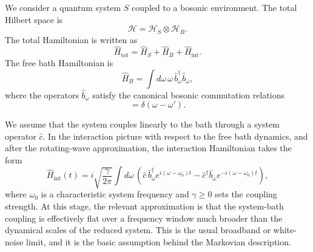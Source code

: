 We consider a quantum system $S$ coupled to a bosonic environment. The total Hilbert space is
\begin{equation}
	\mathcal{H}=\mathcal{H}_S \otimes \mathcal{H}_B.
\end{equation}
The total Hamiltonian is written as
\begin{equation}
	\hat H_{\mathrm{tot}}
	=
	\hat H_S+\hat H_B+\hat H_{\mathrm{int}}.
	\label{eq:oqs_total_hamiltonian}
\end{equation}
The free bath Hamiltonian is
\begin{equation}
	\hat H_B
	=
	\int d\omega\, \omega\, \hat b_\omega^\dagger \hat b_\omega,
	\label{eq:oqs_bath_hamiltonian}
\end{equation}
where the operators $\hat b_\omega$ satisfy the canonical bosonic commutation relations
\begin{equation}
	[\hat b_\omega,\hat b_{\omega'}^\dagger]=\delta(\omega-\omega').
	\label{eq:oqs_bosonic_commutation_frequency}
\end{equation}

We assume that the system couples linearly to the bath through a system operator $\hat c$. In the interaction picture with respect to the free bath dynamics, and after the rotating-wave approximation, the interaction Hamiltonian takes the form
\begin{equation}
	\hat H_{\mathrm{int}}(t)
	=
	i\sqrt{\frac{\gamma}{2\pi}}
	\int d\omega\,
	\left(
	\hat c\, \hat b_\omega^\dagger e^{i(\omega-\omega_0)t}
	-
	\hat c^\dagger \hat b_\omega e^{-i(\omega-\omega_0)t}
	\right),
	\label{eq:oqs_interaction_hamiltonian_frequency}
\end{equation}
where $\omega_0$ is a characteristic system frequency and $\gamma \geq 0$ sets the coupling strength. At this stage, the relevant approximation is that the system-bath coupling is effectively flat over a frequency window much broader than the dynamical scales of the reduced system. This is the usual broadband or white-noise limit, and it is the basic assumption behind the Markovian description.


